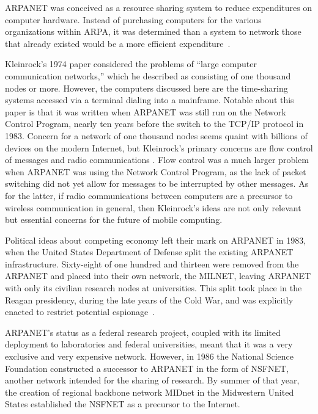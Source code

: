 \documentclass[journal]{IEEEtran}
\begin{document}
ARPANET was conceived as a resource sharing system to reduce expenditures on computer hardware. Instead of purchasing computers for the various organizations within ARPA, it was determined than a system to network those that already existed would be a more efficient expenditure~\cite{quartermanarpa}.

Kleinrock's 1974 paper considered the problems of \enquote{large computer communication networks,} which he described as consisting of one thousand nodes or more. However, the computers discussed here are the time-sharing systems accessed via a terminal dialing into a mainframe. Notable about this paper is that it was written when ARPANET was still run on the Network Control Program, nearly ten years before the switch to the TCP/IP protocol in 1983. Concern for a network of one thousand nodes seems quaint with billions of devices on the modern Internet, but Kleinrock's primary concerns are flow control of messages and radio communications \cite{twobildevices}. Flow control was a much larger problem when ARPANET was using the Network Control Program, as the lack of packet switching did not yet allow for messages to be interrupted by other messages. As for the latter, if radio communications between computers are a precursor to wireless communication in general, then Kleinrock's ideas are not only relevant but essential concerns for the future of mobile computing.

Political ideas about competing economy left their mark on ARPANET in 1983, when the United States Department of Defense split the existing ARPANET infrastructure. Sixty-eight of one hundred and thirteen were removed from the ARPANET and placed into their own network, the MILNET, leaving ARPANET with only its civilian research nodes at universities. This split took place in the Reagan presidency, during the late years of the Cold War, and was explicitly enacted to restrict potential espionage~\cite{nytimesmilnet}.

ARPANET's status as a federal research project, coupled with its limited deployment to laboratories and federal universities, meant that it was a very exclusive and very expensive network. However, in 1986 the National Science Foundation constructed a successor to ARPANET in the form of NSFNET, another network intended for the sharing of research. By summer of that year, the creation of regional backbone network MIDnet in the Midwestern United States established the NSFNET as a precursor to the Internet.
\end{document}
